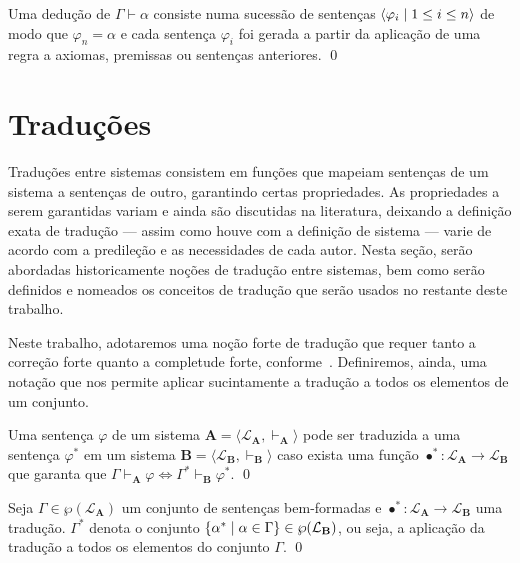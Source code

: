 \begin{definition}[Dedução]
    Uma dedução de $\Gamma\vdash\alpha$ consiste numa sucessão de sentenças $\langle\varphi_i\mid 1 \leq i\leq n\rangle$ de modo que $\varphi_n=\alpha$ e cada sentença $\varphi_i$ foi gerada a partir da aplicação de uma regra a axiomas, premissas ou sentenças anteriores.
    \qed{}
\end{definition}

\section{Traduções}

Traduções entre sistemas consistem em funções que mapeiam sentenças de um sistema a sentenças de outro, garantindo certas propriedades. As propriedades a serem garantidas variam e ainda são discutidas na literatura, deixando a definição exata de tradução --- assim como houve com a definição de sistema --- varie de acordo com a predileção e as necessidades de cada autor. Nesta seção, serão abordadas historicamente noções de tradução entre sistemas, bem como serão definidos e nomeados os conceitos de tradução que serão usados no restante deste trabalho.

Neste trabalho, adotaremos uma noção forte de tradução que requer tanto a correção forte quanto a completude forte, conforme~\cite{Coniglio}. Definiremos, ainda, uma notação que nos permite aplicar sucintamente a tradução a todos os elementos de um conjunto.

\begin{definition}[Tradução] 
    Uma sentença $\varphi$ de um sistema $\mathbf{A} = \langle \mathcal{L}_\mathbf{A}, \vdash_\mathbf{A}\rangle$ pode ser traduzida a uma sentença $\varphi^*$ em um sistema $\mathbf{B} = \langle \mathcal{L}_\mathbf{B}, \vdash_\mathbf{B} \rangle$ caso exista uma função $\bullet^* : \mathcal{L}_\mathbf{A} \to \mathcal{L}_\mathbf{B}$ que garanta que $\Gamma \vdash_\mathbf{A} \varphi \Leftrightarrow \Gamma^* \vdash_\mathbf{B} \varphi^*$.
    \qed{}
\end{definition}

\begin{notation}
    Seja $\Gamma\in\wp(\mathcal{L}_\mathbf{A})$ um conjunto de sentenças bem-formadas e $\bullet^*\mathrel{:}\mathcal{L}_\mathbf{A}\to\mathcal{L}_\mathbf{B}$ uma tradução. $\Gamma^*$ denota o conjunto $\left\{\alpha^*\mid\alpha\in\Gamma\right\}\in\wp(\mathcal{L}_\mathbf{B})$, ou seja, a aplicação da tradução a todos os elementos do conjunto $\Gamma$.
    \qed{}
\end{notation}

